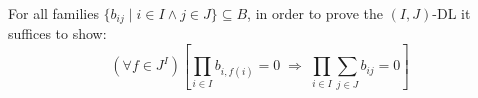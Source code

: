 For all families $\{b_{ij} \mid i \in I \land j \in J\} \subseteq B$, in order to prove the $(I, J)$-DL it suffices to show:
$$
(\forall f \in J^I) \left[ \prod_{i \in I} b_{i, f(i)} = 0 \;\Longrightarrow\; \prod_{i \in I} \sum_{j \in J} b_{ij} = 0 \right]
$$
